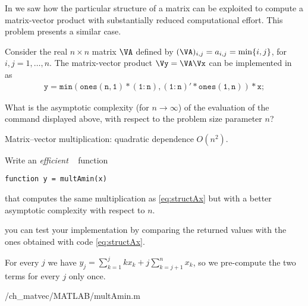 \renewcommand{\chpt}{ch_matvec}

\begin{problem} 
  \label{prb:StructuredMatrixVector}

In  we saw how the particular structure of a matrix can be
exploited to compute a matrix-vector product with substantially reduced
computational effort. This problem presents a similar case. 

Consider the real $n\times n$ matrix $\VA$ defined by $(\VA)_{i,j}=a_{i,j}=\min\{i,j\}$, for $i,j=1,\ldots,n$.
The matrix-vector product $\Vy=\VA\Vx$ can be implemented in \Matlab~ as
\begin{gather} \label{eq:structAx}
  \mathtt{ y = min(ones(n,1)*(1:n), (1:n)'*ones(1,n)) * x;}
\end{gather}

\begin{subproblem}[1] \label{subprb:StructuredMatrixVector_1}
What is the asymptotic complexity (for $n\to\infty$) of the evaluation of the \Matlab~ command displayed above, with respect to the problem size parameter $n$?

\begin{solution}
Matrix--vector multiplication:  quadratic dependence $O(n^2)$.
\end{solution}

\end{subproblem}

\begin{subproblem}[3] \label{subprb:StructuredMatrixVector_2}
%
Write an \emph{efficient} \Matlab~ function 
%
\begin{center}
\texttt{function y = multAmin(x)}
\end{center}
%
that computes the same multiplication as \eqref{eq:structAx} but with a better asymptotic complexity with respect to {$n$}.

\begin{hint}
you can test your implementation by comparing the returned values with the ones obtained with code \eqref{eq:structAx}.
\end{hint}

\begin{solution}
%
For every $j$ we have $y_j = \sum_{k=1}^j k x_k + j \sum_{k=j+1}^n x_k$, so we pre-compute the two terms for every $j$ only once.
%

{\problems/\chpt/MATLAB/multAmin.m}
\end{solution}


\end{subproblem}
\end{problem}
